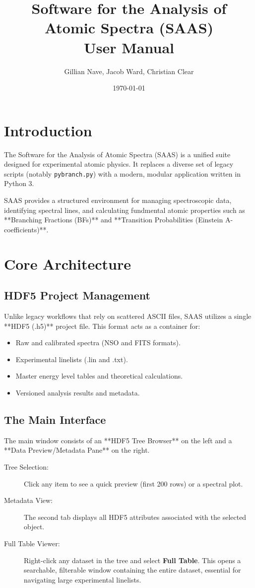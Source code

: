 \documentclass[11pt,a4paper]{article}
\title{Software for the Analysis of Atomic Spectra (SAAS) \\ \Large User Manual}
\author{Gillian Nave, Jacob Ward, Christian Clear}
\date{\today}
\begin{document}
\maketitle

\tableofcontents
\newpage

\section{Introduction}
The Software for the Analysis of Atomic Spectra (SAAS) is a unified suite designed for experimental atomic physics. It replaces a diverse set of legacy scripts (notably \texttt{pybranch.py}) with a modern, modular application written in Python 3.

SAAS provides a structured environment for managing spectroscopic data, identifying spectral lines, and calculating fundmental atomic properties such as **Branching Fractions (BFs)** and **Transition Probabilities (Einstein A-coefficients)**.

\section{Core Architecture}
\subsection{HDF5 Project Management}
Unlike legacy workflows that rely on scattered ASCII files, SAAS utilizes a single **HDF5 (.h5)** project file. This format acts as a container for:
\begin{itemize}
    \item Raw and calibrated spectra (NSO and FITS formats).
    \item Experimental linelists (.lin and .txt).
    \item Master energy level tables and theoretical calculations.
    \item Versioned analysis results and metadata.
\end{itemize}

\subsection{The Main Interface}
The main window consists of an **HDF5 Tree Browser** on the left and a **Data Preview/Metadata Pane** on the right.
\begin{description}
    \item[Tree Selection:] Click any item to see a quick preview (first 200 rows) or a spectral plot.
    \item[Metadata View:] The second tab displays all HDF5 attributes associated with the selected object.
    \item[Full Table Viewer:] Right-click any dataset in the tree and select \textbf{Full Table}. This opens a searchable, filterable window containing the entire dataset, essential for navigating large experimental linelists.
\end{description}
\end{document}
